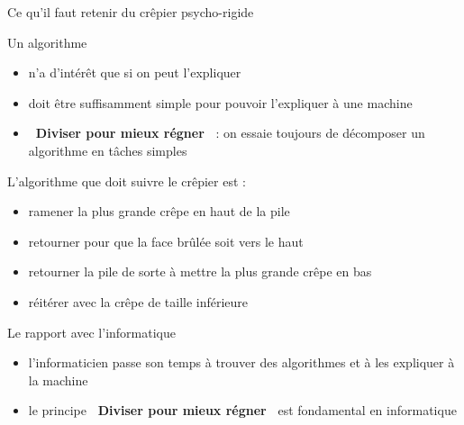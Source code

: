 \documentclass[final,hyperref={pdfpagelabels=false}]{beamer}
\begin{document}
\begin{frame}{Ce qu'il faut retenir du  crêpier psycho-rigide}

  \begin{block}{Un algorithme}
    \begin{itemize}
    \item n'a d'intérêt que si on peut l'expliquer
    \item doit être suffisamment simple pour pouvoir l'expliquer à une machine
    \item \alert{\textbf{\og~Diviser pour mieux régner~\fg}} : on essaie
    toujours de décomposer un algorithme en tâches simples
    \end{itemize}
  \end{block}

  \begin{block}{L'algorithme que doit suivre le crêpier est :}
    \begin{itemize}
    \item ramener la plus grande crêpe en haut de la pile
    \item retourner pour que la face brûlée soit vers le haut
    \item retourner la pile de sorte à mettre la plus grande crêpe en bas
    \item réitérer avec la crêpe de taille inférieure
    \end{itemize}
  \end{block}

  \begin{block}{Le rapport avec l'informatique}
    \begin{itemize}
    \item l'informaticien passe son temps à trouver des algorithmes et  à les
    expliquer à la machine
    \item le principe \alert{\textbf{\og~Diviser pour mieux régner~\fg}} est
    fondamental en informatique
    \end{itemize}
  \end{block}
\end{frame}
\end{document}
